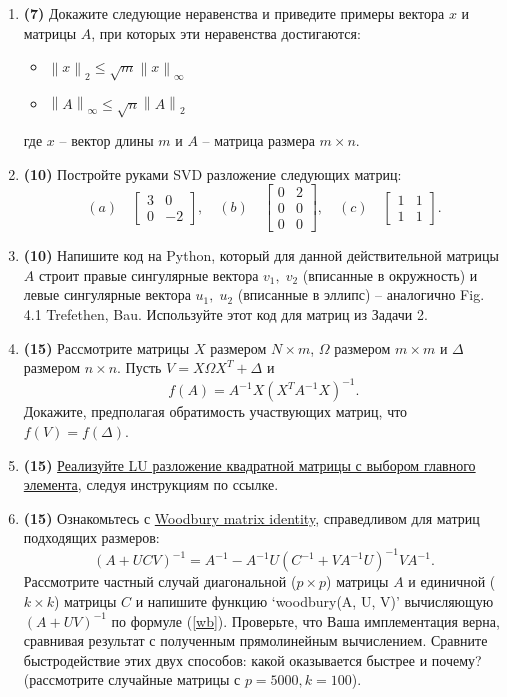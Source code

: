 \documentclass[10pt]{article}
\newcommand{\norm}[1]{\left\lVert#1\right\rVert}
\begin{document}
\begin{enumerate}
\item \textbf{(7)} Докажите следующие неравенства и приведите примеры вектора $x$ и матрицы $A$, при которых эти неравенства достигаются:
\begin{itemize}
\item $\norm{x}_2 \le \sqrt{m}\norm{x}_\infty$
\item $\norm{A}_\infty \le \sqrt{n} \norm{A}_2$
\end{itemize}
где $x$ -- вектор длины $m$ и $A$ -- матрица размера $m\times n$.

\item \textbf{(10)} Постройте руками SVD разложение следующих матриц:
$$
(a)\quad\begin{bmatrix}
3 & 0\\
0 & -2
\end{bmatrix},\quad
(b)\quad\begin{bmatrix}
0 & 2\\
0 & 0\\
0 & 0
\end{bmatrix},\quad
(c)\quad\begin{bmatrix}
1 & 1\\
1 & 1
\end{bmatrix}.
$$

\item \textbf{(10)} Напишите код на Python, который для данной действительной матрицы $A$ строит правые сингулярные вектора $v_1,\; v_2$ (вписанные в окружность) и  левые сингулярные вектора $u_1,\; u_2$ (вписанные в эллипс) -- аналогично Fig. 4.1 Trefethen, Bau. Используйте этот код для матриц из Задачи 2.

\item \textbf{(15)} Рассмотрите матрицы $X$ размером $N\times m$, $ \Omega$ размером $m\times m$ и $ \Delta$ размером $n\times n$. Пусть $V = X \Omega X^T + \Delta$  и
$$
f(A) = A^{-1}X(X^T A^{-1}X)^{-1}.
$$
Докажите, предполагая обратимость участвующих матриц, что $f(V)=f(\Delta)$.

\item \textbf{(15)} \href{https://github.com/ev-br/CP2020/blob/master/week_1_LU_pivoting.ipynb}{Реализуйте LU разложение квадратной матрицы с выбором главного элемента}, следуя инструкциям по ссылке.

\item \textbf{(15)} Ознакомьтесь с \href{https://en.wikipedia.org/wiki/Woodbury_matrix_identity}{Woodbury matrix identity}, справедливом для матриц подходящих размеров:
\begin{equation}
\label{wb}
\left(A+UCV\right)^{-1}=A^{-1}-A^{-1}U\left(C^{-1}+VA^{-1}U\right)^{-1}VA^{-1}.
\end{equation}
Рассмотрите частный случай диагональной ($p\times p$) матрицы $A$ и единичной ($k\times k$) матрицы $C$ и напишите функцию `woodbury(A, U, V)' вычисляющую $\left(A+UV\right)^{-1}$ по формуле (\ref{wb}). Проверьте, что Ваша имплементация верна, сравнивая результат с полученным прямолинейным вычислением.
Сравните быстродействие этих двух способов: какой оказывается быстрее и почему? (рассмотрите случайные матрицы с $p = 5000, k = 100$).




\end{enumerate}
\end{document}
